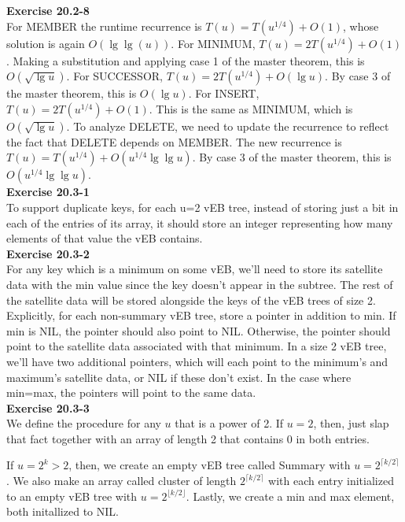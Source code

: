 \documentclass{article}
\begin{document}
\noindent\textbf{Exercise 20.2-8}\\

For MEMBER the runtime recurrence is $T(u) = T(u^{1/4}) + O(1)$, whose solution is again $O(\lg\lg(u))$.  For MINIMUM, $T(u) = 2T(u^{1/4}) + O(1)$. Making a substitution and applying case 1 of the master theorem, this is $O(\sqrt{\lg u})$.  For SUCCESSOR, $T(u) = 2T(u^{1/4}) + O(\lg u)$.  By case 3 of the master theorem, this is $O(\lg u)$.  For INSERT, $T(u) = 2T(u^{1/4}) + O(1)$.  This is the same as MINIMUM, which is $O(\sqrt{\lg u})$.  To analyze DELETE, we need to update the recurrence to reflect the fact that DELETE depends on MEMBER.  The new recurrence is $T(u) = T(u^{1/4}) + O(u^{1/4}\lg \lg u)$.  By case 3 of the master theorem, this is $O(u^{1/4}\lg \lg u)$. \\

\noindent\textbf{Exercise 20.3-1}\\

To support duplicate keys, for each u=2 vEB tree, instead of storing just a bit in each of the entries of its array, it should store an integer representing how many elements of that value the vEB contains.\\

\noindent\textbf{Exercise 20.3-2}\\

For any key which is a minimum on some vEB, we'll need to store its satellite data with the min value since the key doesn't appear in the subtree.  The rest of the satellite data will be stored alongside the keys of the vEB trees of size 2.  Explicitly, for each non-summary vEB tree, store a pointer in addition to min.  If min is NIL, the pointer should also point to NIL.  Otherwise, the pointer should point to the satellite data associated with that minimum.  In a size 2 vEB tree, we'll have two additional pointers, which will each point to the minimum's and maximum's satellite data, or NIL if these don't exist.  In the case where min=max, the pointers will point to the same data. \\

\noindent\textbf{Exercise 20.3-3}\\

We define the procedure for any $u$ that is a power of 2. If $u=2$, then, just slap that fact together with an array of length 2 that contains 0 in both entries. 

If $u = 2^k > 2$, then, we create an empty vEB tree called Summary with $u= 2^{\lceil k/2\rceil}$. We also make an array called cluster of length $2^{\lceil k/2\rceil}$ with each entry initialized to an empty vEB tree with $u = 2^{\lfloor k/2\rfloor}$. Lastly, we create a min and max element, both initallized to NIL.\\
\end{document}

